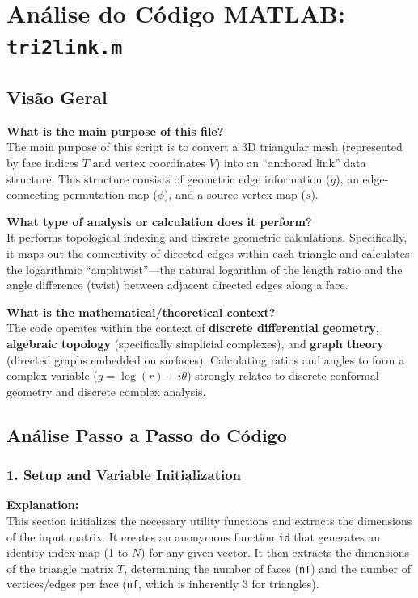 
\chapter{Análise do Código MATLAB: \texttt{tri2link.m}}
\section{Visão Geral}

\textbf{What is the main purpose of this file?} \\
The main purpose of this script is to convert a 3D triangular mesh (represented by face indices $T$ and vertex coordinates $V$) into an ``anchored link'' data structure. This structure consists of geometric edge information ($g$), an edge-connecting permutation map ($\phi$), and a source vertex map ($s$).

\textbf{What type of analysis or calculation does it perform?} \\
It performs topological indexing and discrete geometric calculations. Specifically, it maps out the connectivity of directed edges within each triangle and calculates the logarithmic ``amplitwist''---the natural logarithm of the length ratio and the angle difference (twist) between adjacent directed edges along a face.

\textbf{What is the mathematical/theoretical context?} \\
The code operates within the context of \textbf{discrete differential geometry}, \textbf{algebraic topology} (specifically simplicial complexes), and \textbf{graph theory} (directed graphs embedded on surfaces). Calculating ratios and angles to form a complex variable ($g = \log(r) + i\theta$) strongly relates to discrete conformal geometry and discrete complex analysis.

\section{Análise Passo a Passo do Código}

\subsection{1. Setup and Variable Initialization}
\textbf{Explanation:} \\
This section initializes the necessary utility functions and extracts the dimensions of the input matrix. It creates an anonymous function \texttt{id} that generates an identity index map (1 to $N$) for any given vector. It then extracts the dimensions of the triangle matrix $T$, determining the number of faces (\texttt{nT}) and the number of vertices/edges per face (\texttt{nf}, which is inherently 3 for triangles).

